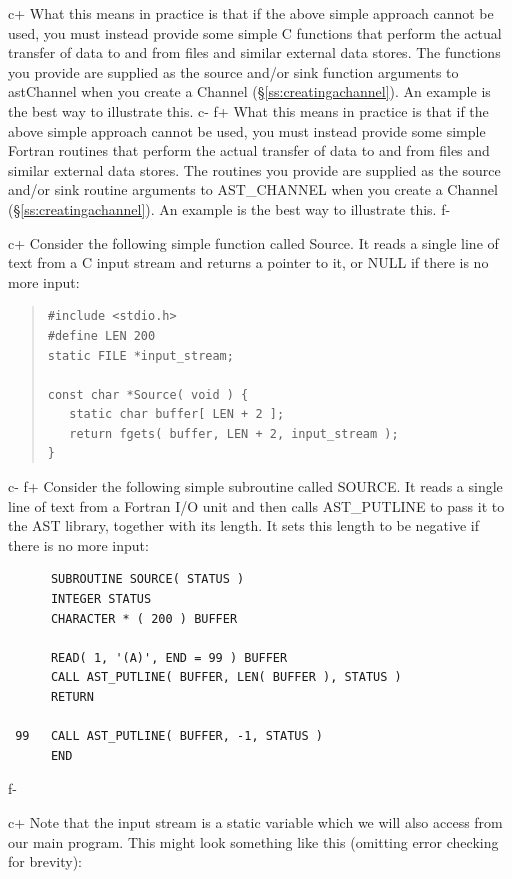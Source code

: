 \documentclass[twoside,11pt]{article}
\newcommand{\secref}[1]{\S\ref{#1}}
\newcommand{\secref}[1]{\ref{#1}}
\begin{document}
c+
What this means in practice is that if the above simple approach cannot
be used, you must instead provide some simple C
functions that perform the actual transfer of data to and from files
and similar external data stores. The functions you provide are
supplied as the source and/or sink function arguments to astChannel
when you create a Channel (\secref{ss:creatingachannel}). An example is
the best way to illustrate this.
c-
f+
What this means in practice is that if the above simple approach cannot
be used, you must instead provide some simple
Fortran routines that perform the actual transfer of data to and from
files and similar external data stores. The routines you provide are
supplied as the source and/or sink routine arguments to AST\_CHANNEL
when you create a Channel (\secref{ss:creatingachannel}). An example is
the best way to illustrate this.
f-

c+
Consider the following simple function called Source. It reads a
single line of text from a C input stream and returns a pointer to it,
or NULL if there is no more input:

\begin{quote}
\small
\begin{verbatim}
#include <stdio.h>
#define LEN 200
static FILE *input_stream;

const char *Source( void ) {
   static char buffer[ LEN + 2 ];
   return fgets( buffer, LEN + 2, input_stream );
}
\end{verbatim}
\normalsize
\end{quote}
c-
f+
Consider the following simple subroutine called SOURCE. It reads a
single line of text from a Fortran I/O unit and then calls
AST\_PUTLINE to pass it to the AST library, together with its
length. It sets this length to be negative if there is no more input:

\small
\begin{verbatim}
      SUBROUTINE SOURCE( STATUS )
      INTEGER STATUS
      CHARACTER * ( 200 ) BUFFER

      READ( 1, '(A)', END = 99 ) BUFFER
      CALL AST_PUTLINE( BUFFER, LEN( BUFFER ), STATUS )
      RETURN

 99   CALL AST_PUTLINE( BUFFER, -1, STATUS )
      END
\end{verbatim}
\normalsize
f-

c+
Note that the input stream is a static variable which we will also
access from our main program. This might look something like this
(omitting error checking for brevity):
\end{document}
